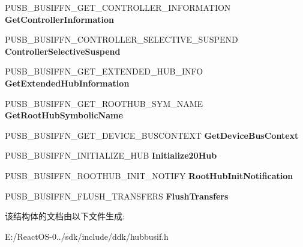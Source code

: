 \begin{DoxyCompactItemize}
P\+U\+S\+B\+\_\+\+B\+U\+S\+I\+F\+F\+N\+\_\+\+G\+E\+T\+\_\+\+C\+O\+N\+T\+R\+O\+L\+L\+E\+R\+\_\+\+I\+N\+F\+O\+R\+M\+A\+T\+I\+ON {\bfseries Get\+Controller\+Information}
\item 
\mbox{\label{struct___u_s_b___b_u_s___i_n_t_e_r_f_a_c_e___h_u_b___v4_abd938cf5070b602f065b20551d596b1f}} 
P\+U\+S\+B\+\_\+\+B\+U\+S\+I\+F\+F\+N\+\_\+\+C\+O\+N\+T\+R\+O\+L\+L\+E\+R\+\_\+\+S\+E\+L\+E\+C\+T\+I\+V\+E\+\_\+\+S\+U\+S\+P\+E\+ND {\bfseries Controller\+Selective\+Suspend}
\item 
\mbox{\label{struct___u_s_b___b_u_s___i_n_t_e_r_f_a_c_e___h_u_b___v4_adb05ca877b7ed02a7fd742c931a1e0fa}} 
P\+U\+S\+B\+\_\+\+B\+U\+S\+I\+F\+F\+N\+\_\+\+G\+E\+T\+\_\+\+E\+X\+T\+E\+N\+D\+E\+D\+\_\+\+H\+U\+B\+\_\+\+I\+N\+FO {\bfseries Get\+Extended\+Hub\+Information}
\item 
\mbox{\label{struct___u_s_b___b_u_s___i_n_t_e_r_f_a_c_e___h_u_b___v4_ae1949c6e3b3f6b7f74461813e0c11099}} 
P\+U\+S\+B\+\_\+\+B\+U\+S\+I\+F\+F\+N\+\_\+\+G\+E\+T\+\_\+\+R\+O\+O\+T\+H\+U\+B\+\_\+\+S\+Y\+M\+\_\+\+N\+A\+ME {\bfseries Get\+Root\+Hub\+Symbolic\+Name}
\item 
\mbox{\label{struct___u_s_b___b_u_s___i_n_t_e_r_f_a_c_e___h_u_b___v4_acb366ee630605e49241ffd65b6f38dc1}} 
P\+U\+S\+B\+\_\+\+B\+U\+S\+I\+F\+F\+N\+\_\+\+G\+E\+T\+\_\+\+D\+E\+V\+I\+C\+E\+\_\+\+B\+U\+S\+C\+O\+N\+T\+E\+XT {\bfseries Get\+Device\+Bus\+Context}
\item 
\mbox{\label{struct___u_s_b___b_u_s___i_n_t_e_r_f_a_c_e___h_u_b___v4_aa6077f83507ab5c8130b706c944f838a}} 
P\+U\+S\+B\+\_\+\+B\+U\+S\+I\+F\+F\+N\+\_\+\+I\+N\+I\+T\+I\+A\+L\+I\+Z\+E\+\_\+H\+UB {\bfseries Initialize20\+Hub}
\item 
\mbox{\label{struct___u_s_b___b_u_s___i_n_t_e_r_f_a_c_e___h_u_b___v4_a210764a98e72188aba7b214fababbd84}} 
P\+U\+S\+B\+\_\+\+B\+U\+S\+I\+F\+F\+N\+\_\+\+R\+O\+O\+T\+H\+U\+B\+\_\+\+I\+N\+I\+T\+\_\+\+N\+O\+T\+I\+FY {\bfseries Root\+Hub\+Init\+Notification}
\item 
\mbox{\label{struct___u_s_b___b_u_s___i_n_t_e_r_f_a_c_e___h_u_b___v4_a4660acf49ee56bfdf0f93dc125854c2c}} 
P\+U\+S\+B\+\_\+\+B\+U\+S\+I\+F\+F\+N\+\_\+\+F\+L\+U\+S\+H\+\_\+\+T\+R\+A\+N\+S\+F\+E\+RS {\bfseries Flush\+Transfers}
\end{DoxyCompactItemize}


该结构体的文档由以下文件生成\+:\begin{DoxyCompactItemize}
\item 
E\+:/\+React\+O\+S-\/0../sdk/include/ddk/hubbusif.\+h\end{DoxyCompactItemize}
